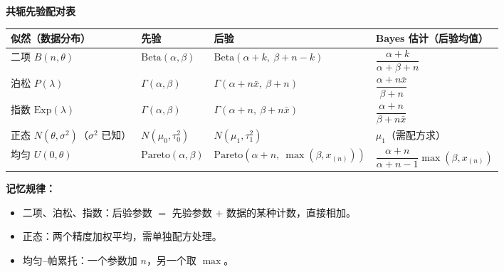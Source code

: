 \begin{note}
\textbf{共轭先验配对表}

\begin{table}[h]
\centering
\renewcommand{\arraystretch}{2}
\begin{tabular}{llll}
\toprule
\textbf{似然（数据分布）} & \textbf{先验} & \textbf{后验} & \textbf{Bayes 估计（后验均值）} \\
\midrule
二项 $B(n,\theta)$
    & $\mathrm{Beta}(\alpha,\beta)$
    & $\mathrm{Beta}(\alpha+k,\ \beta+n-k)$
    & $\dfrac{\alpha+k}{\alpha+\beta+n}$ \\

泊松 $P(\lambda)$
    & $\Gamma(\alpha,\beta)$
    & $\Gamma(\alpha+n\bar{x},\ \beta+n)$
    & $\dfrac{\alpha+n\bar{x}}{\beta+n}$ \\

指数 $\mathrm{Exp}(\lambda)$
    & $\Gamma(\alpha,\beta)$
    & $\Gamma(\alpha+n,\ \beta+n\bar{x})$
    & $\dfrac{\alpha+n}{\beta+n\bar{x}}$ \\

正态 $N(\theta,\sigma^2)$（$\sigma^2$ 已知）
    & $N(\mu_0,\tau_0^2)$
    & $N(\mu_1,\tau_1^2)$
    & $\mu_1$（需配方求）\\

均匀 $U(0,\theta)$
    & $\mathrm{Pareto}(\alpha,\beta)$
    & $\mathrm{Pareto}\!\left(\alpha+n,\ \max(\beta,x_{(n)})\right)$
    & $\dfrac{\alpha+n}{\alpha+n-1}\max(\beta,x_{(n)})$ \\
\bottomrule
\end{tabular}
\end{table}

\textbf{记忆规律：}
\begin{itemize}
    \item 二项、泊松、指数：后验参数 $=$ 先验参数 $+$ 数据的某种计数，直接相加。
    \item 正态：两个精度加权平均，需单独配方处理。
    \item 均匀--帕累托：一个参数加 $n$，另一个取 $\max$。
\end{itemize}
\end{note}

